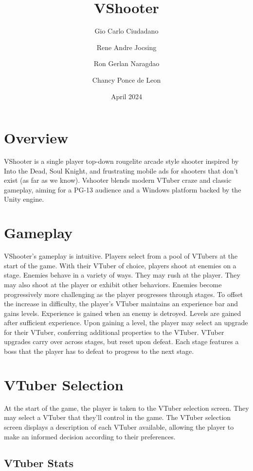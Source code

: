\documentclass[10pt, a4paper]{article}
\title{\textbf{VShooter}}
\author{Gio Carlo Ciudadano \and Rene Andre Jocsing \and Ron Gerlan Naragdao \and Chancy Ponce de Leon}
\date{April 2024}
\begin{document}
\maketitle


	\section{Overview}

	VShooter is a single player top-down rougelite arcade style shooter inspired by Into the Dead, Soul Knight, and frustrating mobile ads for shooters that don't exist (as far as we know). Vshooter blends modern VTuber craze and classic gameplay, aiming for a PG-13 audience and a Windows platform backed by the Unity engine.

  	\section{Gameplay}

	VShooter's gameplay is intuitive. Players select from a pool of VTubers at the start of the game. With their VTuber of choice, players shoot at enemies on a stage. Enemies behave in a variety of ways. They may rush at the player. They may also shoot at the player or exhibit other behaviors. Enemies become progressively more challenging as the player progresses through stages. To offset the increase in difficulty, the player's VTuber maintains an experience bar and gains levels. Experience is gained when an enemy is detroyed. Levels are gained after sufficient experience. Upon gaining a level, the player may select an upgrade for their VTuber, conferring additional properties to the VTuber. VTuber upgrades carry over across stages, but reset upon defeat. Each stage features a boss that the player has to defeat to progress to the next stage.

	\section{VTuber Selection}

	At the start of the game, the player is taken to the VTuber selection screen. They may select a VTuber that they'll control in the game. The VTuber selection screen displays a description of each VTuber available, allowing the player to make an informed decision according to their preferences.
  	
  	\subsection{VTuber Stats} \label{Player Stats}
  	
\end{document}
